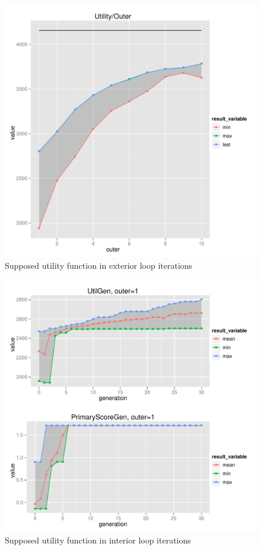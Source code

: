 \begin{figure}[tb]
  \centering \includegraphics[width=1.0\textwidth]{exp/nouncert/c2_utilouter}
  \caption{Supposed utility function in exterior loop iterations}
  \label{c2_utilouter}
\end{figure}


\begin{figure}
  \centering \includegraphics[width=1.0\textwidth]{exp/nouncert/c2_utilgen_01}
  \caption{Supposed utility function in interior loop iterations}
  \label{c2_utilgen_01}
\end{figure}

